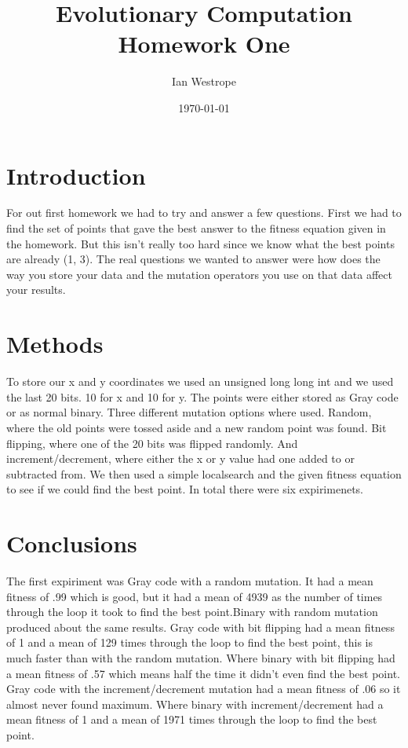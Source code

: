 \documentclass[12pt]{article}
\author{Ian Westrope}
\title{Evolutionary Computation Homework One}
\date{\today}
\begin{document}
\maketitle

\section{Introduction}
For out first homework we had to try and answer a few questions. First we had
to find the set of points that gave the best answer to the fitness equation given in the homework. But this isn't really too hard since we know what the best points are already (1, 3). The real questions we wanted to answer were how does the way you store your data and the mutation operators you use on that data affect your results.



\section{Methods}
To store our x and y coordinates we used an unsigned long long int and we used the last 20 bits. 10 for x and 10 for y. The points were either stored as Gray code or as normal binary. Three different mutation options where used. Random, where the old points were tossed aside and a new random point was found. Bit flipping, where one of the 20 bits was flipped randomly. And increment/decrement, where either the x or y value had one added to or subtracted from. We then used a simple localsearch and the given fitness equation to see if we could find the best point. In total there were six expirimenets.

\section{Conclusions}
The first expiriment was Gray code with a random mutation. It had a mean fitness of .99 which is good, but it had a mean of 4939 as the number of times through the loop it took to find the best point.Binary with random mutation produced about the same results. Gray code with bit flipping had a mean fitness of 1 and a mean of 129 times through the loop to find the best point, this is much faster than with the random mutation. Where binary with bit flipping had a mean fitness of .57 which means half the time it didn't even find the best point. Gray code with the increment/decrement mutation had a mean fitness of .06 so it almost never found maximum. Where binary with increment/decrement had a mean fitness of 1 and a mean of 1971 times through the loop to find the best point.
\end{document}
